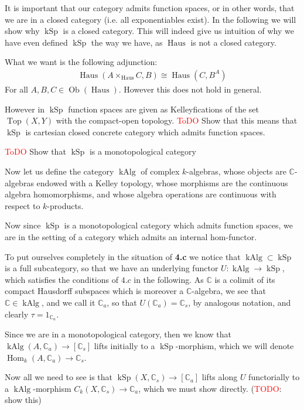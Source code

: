 \documentclass[12pt,a4paper]{article}
\DeclareMathOperator{\Hom}{Hom}
\DeclareMathOperator{\Top}{Top}
\DeclareMathOperator{\Ob}{Ob}
\DeclareMathOperator{\kSp}{kSp}
\DeclareMathOperator{\Haus}{Haus}
\DeclareMathOperator{\kAlg}{kAlg}
\begin{document}
It is important that our category admits function spaces, or in other words, that we are in a closed category (i.e. all exponentiables exist). In the following we will show why $\kSp$ is a closed category. This will indeed give us intuition of why we have even defined $\kSp$ the way we have, as $\Haus $ is not a closed category.  

What we want is the following adjunction:
\begin{align*}
	\Haus(A \times_{\Haus}C, B) \cong \Haus(C, B^A)
\end{align*}
For all $A, B, C \in \Ob(\Haus)$. However this does not hold in general. 

However in $\kSp$ function spaces are given as Kelleyfications of the set $\Top(X,Y)$ with the compact-open topology. 
\textcolor{red}{ToDO} Show that this means that $\kSp$ is cartesian closed concrete category which admits function spaces.

\textcolor{red}{ToDO} Show that $\kSp$ is a monotopological category

Now let us define the category $\kAlg$ of complex $k$-algebras, whose objects are $\mathbb{C}$-algebras endowed with a Kelley topology, whose morphisms are the continuous algebra homomorphisms, and whose algebra operations are continuous with respect to $k$-products. 

Now since $\kSp$ is a monotopological category which admits function spaces, we are in the setting of a category which admits an internal hom-functor. 

To put ourselves completely in the situation of \textbf{4.c} we notice that $\kAlg \subset \kSp$ is a full subcategory, so that we have an underlying functor $U: \kAlg \to \kSp$, which satisfies the conditions of $4.c$ in the following. As $\mathbb{C}$ is a colimit of its compact Hausdorff subspaces which is moreover a $\mathbb{C}$-algebra, we see that $\mathbb{C} \in \kAlg$, and we call it $\mathbb{C}_a$,  so that $U(\mathbb{C}_a) = \mathbb{C}_s$, by analogous notation, and clearly $\tau = 1_{\mathbb{C}_a}. $

Since  we are in a monotopological category, then we know that $\kAlg(A, \mathbb{C}_a) \to [\mathbb{C}_s]$
lifts initially to a $\kSp$-morphism, which we will denote $\Hom_k(A, \mathbb{C}_a) \to \mathbb{C}_s$.

Now all we need to see is that $\kSp(X,\mathbb{C}_s) \to [\mathbb{C}_a]$ lifts along $U$ functorially to a $\kAlg$-morphism $C_k(X, \mathbb{C}_s) \to \mathbb{C}_a$, which we must show directly. (\textcolor{red}{TODO}: show this)
\end{document}
